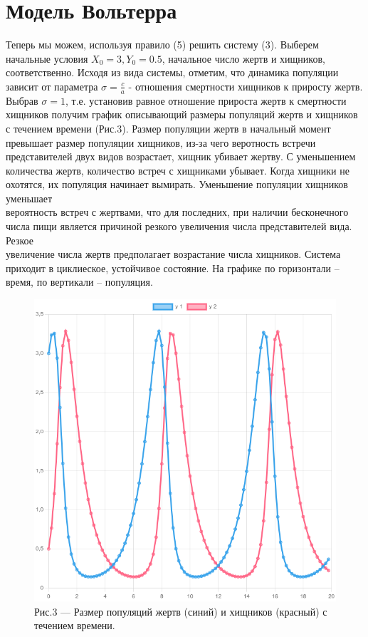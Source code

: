 \documentclass[a4paper,12pt]{article}
\begin{document}
\section{Модель Вольтерра}
\hspace{0.5cm} Теперь мы можем, используя правило (5) решить систему (3). Выберем начальные условия
$X_0 = 3, Y_0 = 0.5$, начальное число жертв и хищников, соответственно. Исходя из вида системы, отметим, что
динамика популяции зависит от параметра $\sigma = \frac{c}{a}$ - отношения смертности хищников к приросту жертв.
Выбрав $\sigma = 1$, т.е. установив равное отношение прироста жертв к смертности хищников получим график 
описывающий размеры популяций жертв и хищников с течением времени (Рис.3). Размер популяции жертв 
в начальный момент превышает размер популяции хищников, из-за чего веротность встречи представителей двух
видов возрастает, хищник убивает жертву. С уменьшением количества жертв, количество встреч 
с хищниками убывает. Когда хищники не охотятся, их популяция начинает вымирать. Уменьшение популяции хищников уменьшает \\
вероятность встреч с жертвами, что для последних, при наличии бесконечного числа пищи 
является причиной резкого увеличения числа представителей вида. Резкое \\
увеличение числа жертв предполагает возрастание числа хищников. Система приходит в циклиеское, устойчивое состояние. 
На графике по горизонтали -- время, по вертикали -- популяция.
\begin{figure}[h]
    \centering
    \includegraphics[width=0.5\linewidth]{pictures/task1.png}
    \captionsetup{labelformat=empty}
    \caption{Рис.3 --- Размер популяций жертв (синий) и хищников (красный) с течением времени.}
\end{figure}
\newpage
\end{document}

